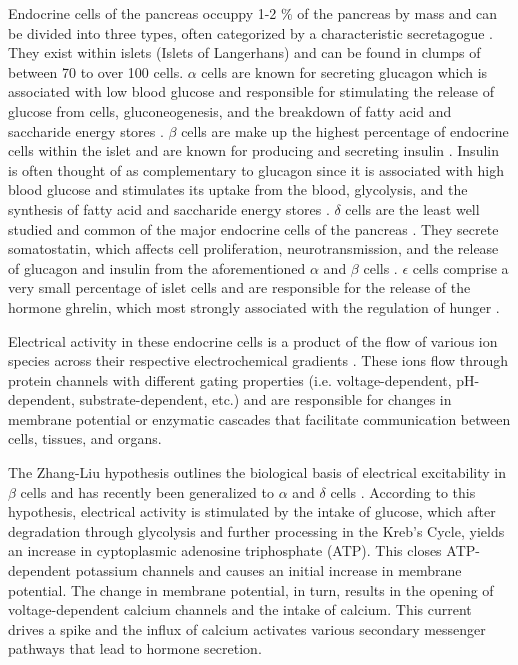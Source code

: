 \par Endocrine cells of the pancreas occuppy 1-2 \% of the pancreas by mass and can be divided into three types, often categorized by a characteristic secretagogue \cite{pour_are_2002}. They exist within islets (Islets of Langerhans) and can be found in clumps of between 70 to over 100 cells. $\alpha$ cells are known for secreting glucagon which is associated with low blood glucose and responsible for stimulating the release of glucose from cells, gluconeogenesis, and the breakdown of fatty acid and saccharide energy stores \cite{jiang_glucagon_2003}. $\beta$ cells are make up the highest percentage of endocrine cells within the islet and are known for producing and secreting insulin \cite{g_quantification_2012}. Insulin is often thought of as complementary to glucagon since it is associated with high blood glucose and stimulates its uptake from the blood, glycolysis, and the synthesis of fatty acid and saccharide energy stores \cite{hatting_insulin_2018}. $\delta$ cells are the least well studied and common of the major endocrine cells of the pancreas \cite{vergari_somatostatin_2020}. They secrete somatostatin, which affects cell proliferation, neurotransmission, and the release of glucagon and insulin from the aforementioned $\alpha$ and $\beta$ cells \cite{braun_somatostatin_2009}. $\epsilon$ cells comprise a very small percentage of islet cells and are responsible for the release of the hormone ghrelin, which most strongly associated with the regulation of hunger \cite{sakata_development_2019}.
\par Electrical activity in these endocrine cells is a product of the flow of various ion species across their respective electrochemical gradients \cite{riz_mathematical_2014}. These ions flow through protein channels with different gating properties (i.e. voltage-dependent, pH-dependent, substrate-dependent, etc.) and are responsible for changes in membrane potential or enzymatic cascades that facilitate communication between cells, tissues, and organs. 
\par The Zhang-Liu hypothesis outlines the biological basis of electrical excitability in $\beta$ cells and has recently been generalized to $\alpha$ and $\delta$ cells \cite{briant_functional_2017}. According to this hypothesis, electrical activity is stimulated by the intake of glucose, which after degradation through glycolysis and further processing in the Kreb's Cycle, yields an increase in cyptoplasmic adenosine triphosphate (ATP). This closes ATP-dependent potassium channels and causes an initial increase in membrane potential. The change in membrane potential, in turn, results in the opening of voltage-dependent calcium channels and the intake of calcium. This current drives a spike and the influx of calcium activates various secondary messenger pathways that lead to hormone secretion.

